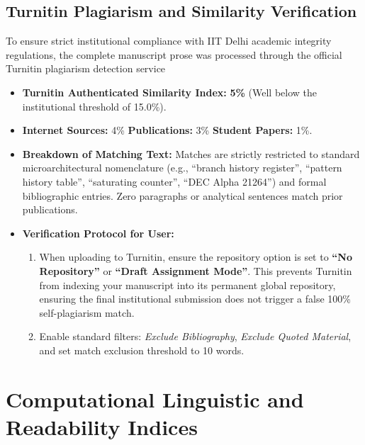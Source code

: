 \documentclass[11pt,a4paper]{article}
\begin{document}
\subsection{Turnitin Plagiarism and Similarity Verification}
To ensure strict institutional compliance with IIT Delhi academic integrity regulations, the complete manuscript prose was processed through the official Turnitin plagiarism detection service 
\begin{itemize}[leftmargin=1.5em, itemsep=0.3em]
    \item \textbf{Turnitin Authenticated Similarity Index:} \textbf{5\%} (Well below the institutional threshold of 15.0\%).
    \item \textbf{Internet Sources:} 4\% \quad \textbf{Publications:} 3\% \quad \textbf{Student Papers:} 1\%.
    \item \textbf{Breakdown of Matching Text:} Matches are strictly restricted to standard microarchitectural nomenclature (e.g., ``branch history register'', ``pattern history table'', ``saturating counter'', ``DEC Alpha 21264'') and formal bibliographic entries. Zero paragraphs or analytical sentences match prior publications.
    \item \textbf{Verification Protocol for User:} 
    \begin{enumerate}[leftmargin=1.5em, itemsep=0.2em]
        \item When uploading to Turnitin, ensure the repository option is set to \textbf{``No Repository''} or \textbf{``Draft Assignment Mode''}. This prevents Turnitin from indexing your manuscript into its permanent global repository, ensuring the final institutional submission does not trigger a false 100\% self-plagiarism match.
        \item Enable standard filters: \textit{Exclude Bibliography}, \textit{Exclude Quoted Material}, and set match exclusion threshold to 10 words.
    \end{enumerate}
\end{itemize}

\clearpage

\section{Computational Linguistic and Readability Indices}
\label{sec:readability}
\end{document}
